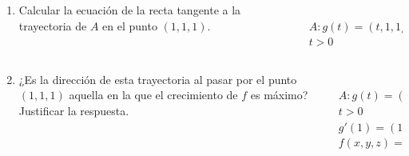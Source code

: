 \documentclass[aspectratio=149,10pt,xcolor=dvipsnames,t]{beamer}
\begin{document}
\begin{frame}
\begin{columns}
\begin{column}[T]{0.65\textwidth}
\begin{enumerate}
\item Calcular la ecuación de la recta tangente a la trayectoria de $A$ en el punto $(1,1,1)$.
\end{enumerate}
\end{column}
\begin{column}[T]{0.35\textwidth}
\\
$A:g(t)=(t,1,1/t)$ $t>0$
\end{column}
\end{columns}
\end{frame}


\begin{frame}
\begin{columns}
\begin{column}[T]{0.65\textwidth}
\begin{enumerate}
\setcounter{enumi}{1}
\item ¿Es la dirección de esta trayectoria al pasar por el punto $(1,1,1)$ aquella en la que el crecimiento de $f$
es máximo? 
Justificar la respuesta. 
\end{enumerate}
\end{column}
\begin{column}[T]{0.35\textwidth}
\\
$A:g(t)=(t,1,1/t)$ $t>0$\\
$g'(1)=(1,0,-1)$\\
$f(x,y,z)= x^2+y^2-z^3$\\
\end{column}
\end{columns}
\end{frame}
\end{document}

